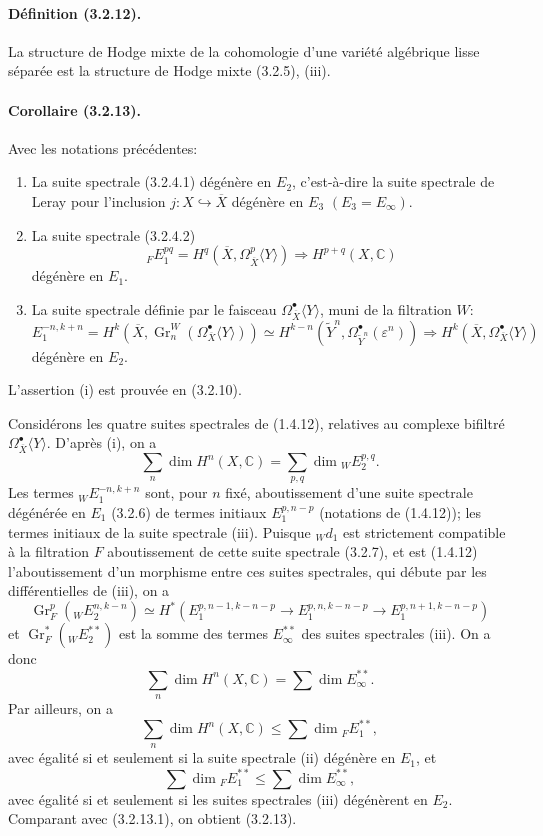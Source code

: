 \documentclass[10pt]{article}
\newcommand{\C}{\mathbb C}
\newcommand{\Gr}{\operatorname{Gr}}
\begin{document}
\paragraph{Définition (3.2.12).} La structure de Hodge mixte de la cohomologie d'une variété algébrique lisse séparée est la structure de Hodge mixte (3.2.5), (iii).

\paragraph{Corollaire (3.2.13).} Avec les notations précédentes:
\begin{enumerate}[label=(\roman*)]
\item La suite spectrale (3.2.4.1) dégénère en $E_2$, c'est-à-dire la suite spectrale de Leray pour l'inclusion $j:X\hookrightarrow\overline X$ dégénère en $E_3$ $(E_3=E_\infty)$.
\item La suite spectrale (3.2.4.2)
\[
{}_F E_1^{pq}=H^q(\overline X,\Omega_{\overline X}^p\langle Y\rangle)
\Longrightarrow H^{p+q}(X,\C)
\]
dégénère en $E_1$.
\item La suite spectrale définie par le faisceau $\Omega_{\overline X}^{\bullet}\langle Y\rangle$, muni de la filtration $W$:
\[
E_1^{-n,k+n}=H^k(\overline X,\Gr_n^W(\Omega_{\overline X}^{\bullet}\langle Y\rangle))
\simeq H^{k-n}(\widetilde Y^n,\Omega_{\widetilde Y^n}^{\bullet}(\varepsilon^n))
\Longrightarrow H^k(\overline X,\Omega_{\overline X}^{\bullet}\langle Y\rangle)
\]
dégénère en $E_2$.
\end{enumerate}

L'assertion (i) est prouvée en (3.2.10).

Considérons les quatre suites spectrales de (1.4.12), relatives au complexe bifiltré $\Omega_{\overline X}^{\bullet}\langle Y\rangle$. D'après (i), on a
\[
\sum_n\dim H^n(X,\C)=\sum_{p,q}\dim {}_WE_2^{p,q}.
\]
Les termes ${}_WE_1^{-n,k+n}$ sont, pour $n$ fixé, aboutissement d'une suite spectrale dégénérée en $E_1$ (3.2.6) de termes initiaux $E_1^{p,n-p}$ (notations de (1.4.12)); les termes initiaux de la suite spectrale (iii). Puisque ${}_Wd_1$ est strictement compatible à la filtration $F$ aboutissement de cette suite spectrale (3.2.7), et est (1.4.12) l'aboutissement d'un morphisme entre ces suites spectrales, qui débute par les différentielles de (iii), on a
\[
\Gr_F^p({}_WE_2^{n,k-n})\simeq
H^*(E_1^{p,n-1,k-n-p}\to E_1^{p,n,k-n-p}\to E_1^{p,n+1,k-n-p})
\]
et $\Gr_F^*({}_WE_2^{**})$ est la somme des termes $E_\infty^{**}$ des suites spectrales (iii). On a donc
\[
\tag{3.2.13.1}
\sum_n \dim H^n(X,\C)=\sum\dim E_\infty^{**}.
\]
Par ailleurs, on a
\[
\sum_n \dim H^n(X,\C)\le \sum \dim {}_F E_1^{**},
\]
avec égalité si et seulement si la suite spectrale (ii) dégénère en $E_1$, et
\[
\sum\dim {}_F E_1^{**}\le \sum\dim E_\infty^{**},
\]
avec égalité si et seulement si les suites spectrales (iii) dégénèrent en $E_2$. Comparant avec (3.2.13.1), on obtient (3.2.13).
\end{document}

